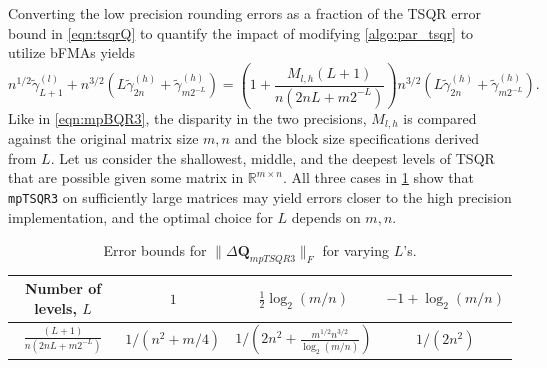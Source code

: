 \documentclass[review,onefignum,onetabnum]{siamart190516}
\newcommand{\R}{\mathbb{R}}
\newcommand{\bb}[1]{\mathbf{#1}}
\begin{document}
Converting the low precision rounding errors as a fraction of the TSQR error bound in \cref{eqn:tsqrQ} to quantify the impact of modifying \cref{algo:par_tsqr} to utilize bFMAs yields
\begin{equation}
n^{1/2}\tilde{\gamma}_{L+1}^{(l)}+n^{3/2}\left(L\tilde{\gamma}_{2n}^{(h)}+\tilde{\gamma}_{m2^{-L}}^{(h)}\right) = \left(1+ \frac{M_{l,h}(L+1)}{n(2nL+m2^{-L})}\right)n^{3/2}\left(L\tilde{\gamma}_{2n}^{(h)}+\tilde{\gamma}_{m2^{-L}}^{(h)}\right).\label{eqn:mpTSQR3}
\end{equation}
Like in \cref{eqn:mpBQR3}, the disparity in the two precisions, $M_{l,h}$ is compared against the original matrix size $m,n$ and the block size specifications derived from $L$.
Let us consider the shallowest, middle, and the deepest levels of TSQR that are possible given some matrix in $\R^{m\times n}$.
All three cases in \cref{table:mpTSQR3} show that {\tt mpTSQR3} on sufficiently large matrices may yield errors closer to the high precision implementation, and the optimal choice for $L$ depends on $m,n$. 
\begin{table}[H]
	\center
	\begin{tabular}{||c|c|c|c||} 
		\hline
		Number of levels, $L$& $1$ & $\frac{1}{2}\log_2(m/n)$ & $-1+\log_2(m/n)$ \\ \hline
		$\frac{(L+1)}{n(2nL+m2^{-L})}$&  $1/(n^2+m/4)$ &$1/\left(2n^2+\frac{m^{1/2}n^{3/2}}{\log_2(m/n)}\right)$ & $1/(2n^2)$\\ \hline
	\end{tabular}
	\caption{Error bounds for $\|\Delta \bb{Q}_{mpTSQR3}\|_F$ for varying $L$'s.} 
	\label{table:mpTSQR3}
\end{table} 
\vspace{-1cm}
\end{document}
